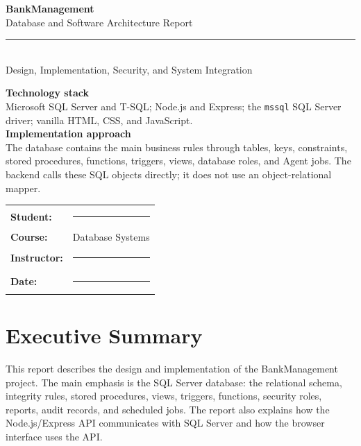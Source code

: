 \documentclass[11pt,a4paper,oneside]{report}
\begin{document}
\begin{titlepage}
\pagecolor{BankNavy}
\color{white}
\vspace*{14mm}
{\Huge\bfseries BankManagement\\[3mm]}
{\LARGE Database and Software Architecture Report\\[7mm]}
\textcolor{BankTeal!45!white}{\rule{\textwidth}{1.2pt}}\\[10mm]
{\Large Design, Implementation, Security, and System Integration}

\vspace{18mm}
\begin{tcolorbox}[
  colback=BankNavy!72!black,
  colframe=BankTeal,
  boxrule=0.9pt,
  arc=3mm,
  left=5mm,right=5mm,top=4mm,bottom=4mm
]
\color{white}
\textbf{Technology stack}\\
Microsoft SQL Server and T-SQL; Node.js and Express; the \texttt{mssql} SQL Server driver; vanilla HTML, CSS, and JavaScript.\\[3mm]
\textbf{Implementation approach}\\
The database contains the main business rules through tables, keys, constraints, stored procedures, functions, triggers, views, database roles, and Agent jobs. The backend calls these SQL objects directly; it does not use an object-relational mapper.
\end{tcolorbox}

\vfill
\begin{tabular}{@{}ll@{}}
\textbf{Student:} & \rule{85mm}{0.4pt}\\[4mm]
\textbf{Course:} & Database Systems\\[4mm]
\textbf{Instructor:} & \rule{78mm}{0.4pt}\\[4mm]
\textbf{Date:} & \rule{91mm}{0.4pt}
\end{tabular}
\vspace*{10mm}
\end{titlepage}
\nopagecolor
\color{black}
\chapter*{Executive Summary}
This report describes the design and implementation of the BankManagement project. The main emphasis is the SQL Server database: the relational schema, integrity rules, stored procedures, views, triggers, functions, security roles, reports, audit records, and scheduled jobs. The report also explains how the Node.js/Express API communicates with SQL Server and how the browser interface uses the API.
\end{document}
